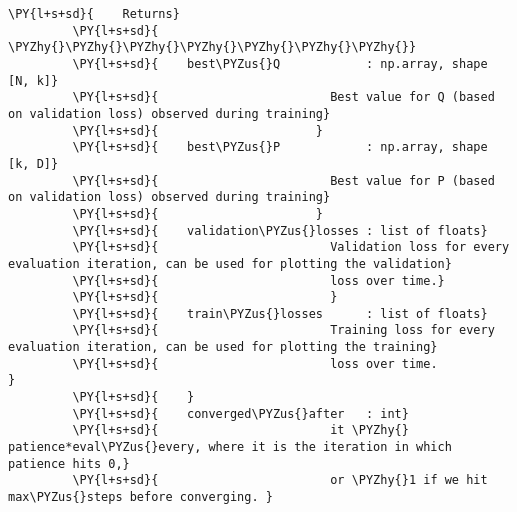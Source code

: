 \begin{Verbatim}[commandchars=\\\{\}]
         \PY{l+s+sd}{    Returns}
         \PY{l+s+sd}{    \PYZhy{}\PYZhy{}\PYZhy{}\PYZhy{}\PYZhy{}\PYZhy{}\PYZhy{}}
         \PY{l+s+sd}{    best\PYZus{}Q            : np.array, shape [N, k]}
         \PY{l+s+sd}{                        Best value for Q (based on validation loss) observed during training}
         \PY{l+s+sd}{                      }
         \PY{l+s+sd}{    best\PYZus{}P            : np.array, shape [k, D]}
         \PY{l+s+sd}{                        Best value for P (based on validation loss) observed during training}
         \PY{l+s+sd}{                      }
         \PY{l+s+sd}{    validation\PYZus{}losses : list of floats}
         \PY{l+s+sd}{                        Validation loss for every evaluation iteration, can be used for plotting the validation}
         \PY{l+s+sd}{                        loss over time.}
         \PY{l+s+sd}{                        }
         \PY{l+s+sd}{    train\PYZus{}losses      : list of floats}
         \PY{l+s+sd}{                        Training loss for every evaluation iteration, can be used for plotting the training}
         \PY{l+s+sd}{                        loss over time.                     }
         \PY{l+s+sd}{    }
         \PY{l+s+sd}{    converged\PYZus{}after   : int}
         \PY{l+s+sd}{                        it \PYZhy{} patience*eval\PYZus{}every, where it is the iteration in which patience hits 0,}
         \PY{l+s+sd}{                        or \PYZhy{}1 if we hit max\PYZus{}steps before converging. }
         

\end{Verbatim}
